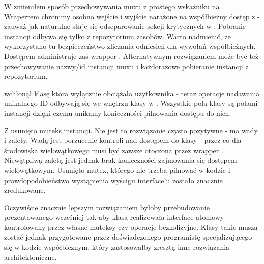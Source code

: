 W  zmieniłem sposób przechowywania muxu z prostego wskaźniku na . Wraperrem  chronimy osobno wejście i wyjście narażone na współbieżny dostęp z  - zauważ jak naturalne staje się odseparowanie sekcji krytycznych w . Pobranie instancji  odbywa się tylko z repozytorium zasobów. Warto nadmienić, że wykorzystano tu bezpieczeństwo zliczania odniesień  dla wywołań współbieżnych. Dostępem administruje zaś wrapper . Alternatywnym rozwiązaniem może być też przechowywanie nazwy/id instancji muxu i każdorazowe pobieranie instancji z repozytorium.

 wchłonął klasę  która wyłącznie obciążała użytkownika - teraz operacje nadawania unikalnego ID odbywają się we wnętrzu klasy w . Wszystkie pola klasy są polami instancji dzięki czemu unikamy konieczności pilnowania dostępu do nich.

Z  usunięto muteks instancji. Nie jest to rozwiązanie czysto pozytywne - ma wady i zalety. Wadą jest porzucenie kontroli nad dostępem do klasy - przez co dla środowiska wielowątkowego musi być zawsze otoczona przez wrapper . Niewątpliwą zaletą jest jednak brak konieczności zajmowania się dostępem wielowątkowym. Usunięto mutex, którego nie trzeba pilnować w kodzie i prawdopodobieństwo wystąpienia wyścigu interface'u zostało znacznie zredukowane.

Oczywiście znacznie lepszym rozwiązaniem byłoby przebudowanie prezentowanego wcześniej  tak aby klasa realizowała interface atomowy kontrolowany przez własne muteksy czy operacje bezkolizyjne. Klasy takie muszą zostać jednak przygotowane przez doświadczonego programistę specjalizującego się w kodzie współbieznym, który zastosowałby zresztą inne rozwiązania architektoniczne.
